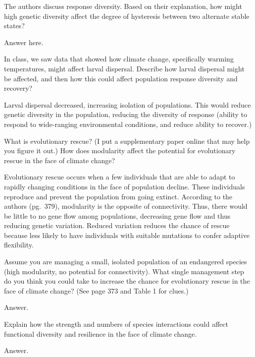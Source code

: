 \documentclass[12pt, addpoints]{exam}
\begin{document}
\begin{questions}

\question[5]
The authors discuss response diversity. Based on their explanation, how might 
high genetic diversity affect the degree of hysteresis between two alternate 
stable states?

\begin{solution}
Answer here.
\end{solution}

\question[5]
In class, we saw data that showed how climate change, specifically
warming temperatures, might affect larval dispersal. Describe how 
larval dispersal might be affected, and then how this could affect 
population response diversity and recovery?


\begin{solution}
	Larval dispersal decreased, increasing isolation of populations.
	This would reduce genetic diversity in the population, reducing
	the diversity of response (ability to respond to wide-ranging
	environmental conditions, and reduce ability to recover.)
\end{solution}

\question[5]
What is evolutionary rescue? (I put a supplementary paper online that may help you figure it out.) How does modularity affect the potential for evolutionary rescue in the face of climate change?


\begin{solution}
	Evolutionary rescue occurs when a few individuals that are able 
	to adapt to rapidly changing conditions in the face of population 
	decline. These individuals reproduce and prevent the population 
	from going extinct. According to the authors (pg.~379), 
	modularity is the opposite of connectivity. Thus, there would be
	little to no gene flow among populations, decreasing gene flow and
	thus reducing genetic variation. Reduced variation reduces the
	chance of rescue because less likely to have individuals with
	suitable mutations to confer adaptive flexibility.
\end{solution}


\question[5]
Assume you are managing a small, isolated population of an endangered 
species (high modularity, no potential for connectivity). What single 
management step do you think you could take to increase the chance
for evolutionary rescue in the face of climate change? (See page 373 and Table 1 for clues.)


\begin{solution}
Answer.
\end{solution}

\question[5]
Explain how the strength and numbers of species interactions could affect functional diversity and resilience in the face of climate change.


\begin{solution}
Answer.
\end{solution}

\end{questions}
\end{document}

